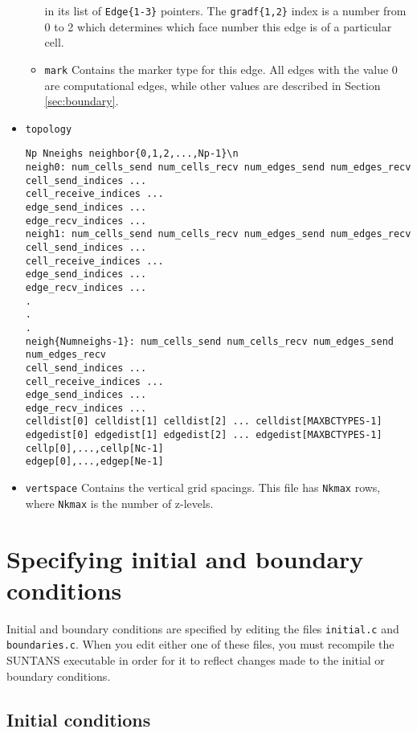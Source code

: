 \documentclass[12pt,oneside]{article}
\begin{document}
\begin{itemize}
\begin{itemize}
in its list of \verb+Edge{1-3}+ pointers.  The \verb+gradf{1,2}+ index is a number from 
0 to 2 which determines which face number this edge is of a particular cell.
\item \verb+mark+ Contains the marker type for this edge.  All edges with the value 0 are
computational edges, while other values are described in Section \ref{sec:boundary}.
\end{itemize}
\item \verb+topology+
\begin{verbatim}
Np Nneighs neighbor{0,1,2,...,Np-1}\n
neigh0: num_cells_send num_cells_recv num_edges_send num_edges_recv
cell_send_indices ...
cell_receive_indices ...
edge_send_indices ...
edge_recv_indices ...
neigh1: num_cells_send num_cells_recv num_edges_send num_edges_recv
cell_send_indices ...
cell_receive_indices ...
edge_send_indices ...
edge_recv_indices ...
.
.
.
neigh{Numneighs-1}: num_cells_send num_cells_recv num_edges_send num_edges_recv
cell_send_indices ...
cell_receive_indices ...
edge_send_indices ...
edge_recv_indices ...
celldist[0] celldist[1] celldist[2] ... celldist[MAXBCTYPES-1]
edgedist[0] edgedist[1] edgedist[2] ... edgedist[MAXBCTYPES-1]
cellp[0],...,cellp[Nc-1]
edgep[0],...,edgep[Ne-1]
\end{verbatim}
\item \verb+vertspace+ Contains the vertical grid spacings.  This file has \verb+Nkmax+ rows,
where \verb+Nkmax+ is the number of z-levels.
\end{itemize}

\section{Specifying initial and boundary conditions} 

Initial and boundary conditions are specified by editing the files \verb+initial.c+ and \verb+boundaries.c+.  When you
edit either one of these files, you must recompile the SUNTANS executable in order for it to reflect changes made
to the initial or boundary conditions.

\subsection{Initial conditions}
\end{document}
